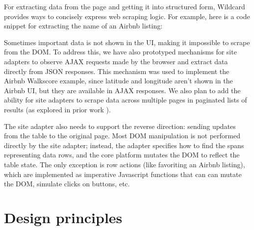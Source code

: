 \documentclass[english,submission]{programming}
\newenvironment{Shaded}{}{}
\newcommand{\CommentTok}[1]{\textcolor[rgb]{0.38,0.63,0.69}{\textit{#1}}}
\newcommand{\FunctionTok}[1]{\textcolor[rgb]{0.02,0.16,0.49}{#1}}
\newcommand{\KeywordTok}[1]{\textcolor[rgb]{0.00,0.44,0.13}{\textbf{#1}}}
\newcommand{\NormalTok}[1]{#1}
\newcommand{\OperatorTok}[1]{\textcolor[rgb]{0.40,0.40,0.40}{#1}}
\newcommand{\SpecialCharTok}[1]{\textcolor[rgb]{0.25,0.44,0.63}{#1}}
\newcommand{\StringTok}[1]{\textcolor[rgb]{0.25,0.44,0.63}{#1}}
\newcommand{\VariableTok}[1]{\textcolor[rgb]{0.10,0.09,0.49}{#1}}
\newcommand{\VerbatimStringTok}[1]{\textcolor[rgb]{0.25,0.44,0.63}{#1}}
\begin{document}
For extracting data from the page and getting it into structured form,
Wildcard provides ways to concisely express web scraping logic. For
example, here is a code snippet for extracting the name of an Airbnb
listing:

\begin{Shaded}
\end{Shaded}

Sometimes important data is not shown in the UI, making it impossible to
scrape from the DOM. To address this, we have also prototyped mechanisms
for site adapters to observe AJAX requests made by the browser and
extract data directly from JSON responses. This mechanism was used to
implement the Airbnb Walkscore example, since latitude and longitude
aren't shown in the Airbnb UI, but they are available in AJAX responses.
We also plan to add the ability for site adapters to scrape data across
multiple pages in paginated lists of results (as explored in prior work
\autocite{huynh2006}).

The site adapter also needs to support the reverse direction: sending
updates from the table to the original page. Most DOM manipulation is
not performed directly by the site adapter; instead, the adapter
specifies how to find the spans representing data rows, and the core
platform mutates the DOM to reflect the table state. The only exception
is row actions (like favoriting an Airbnb listing), which are
implemented as imperative Javascript functions that can can mutate the
DOM, simulate clicks on buttons, etc.

\hypertarget{design-principles}{%
\section{Design principles}\label{design-principles}}
\end{document}
